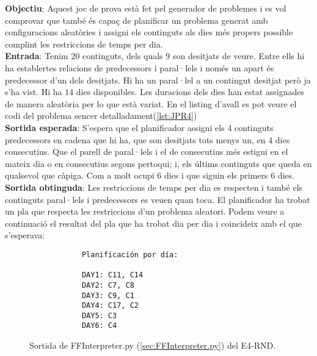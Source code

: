 \documentclass[a4paper]{article}
\begin{document}
	\noindent \textbf{Objectiu}: Aquest joc de prova està fet pel generador de problemes i es vol comprovar que també és capaç de planificar un problema generat amb configuracions aleatòries i assigni els continguts als dies més propers possible complint les restriccions de temps per dia.\\
	
	\noindent \textbf{Entrada}: Tenim 20 continguts, dels quals 9 son desitjats de veure. Entre ells hi ha establertes relacions de predecessors i paral·lels i només un apart és predecessor d'un dels desitjats. Hi ha un paral·lel a un contingut desitjat però ja s'ha vist. Hi ha 14 dies disponibles. Les duracions dels dies han estat assignades de manera aleatòria per lo que està variat. En el listing d'avall es pot veure el codi del problema sencer detalladament(\ref{lst:JPR4})\\
	
	\noindent \textbf{Sortida esperada}: S'espera que el planificador assigni els 4 continguts predecessors en cadena que hi ha, que son desitjats tots menys un, en 4 dies consecutius. Que el parell de paral·lels i el de consecutius més estigui en el mateix dia o en consecutius segons pertoqui; i, els últims continguts que queda en qualsevol que càpiga. Com a molt ocupi 6 dies i que siguin els primers 6 dies.\\
	
	\noindent \textbf{Sortida obtinguda}: Les restriccions de temps per dia es respecten i també els continguts paral·lels i predecessors es veuen quan toca. El planificador ha trobat un pla que respecta les restriccions d'un problema aleatori.  Podem veure a continuació el resultat del pla que ha trobat dia per dia i coincideix amb el que s'esperava:\\
	
	\begin{figure}[H]
		\centering
		\begin{verbatim}
			Planificación por día:
			
			DAY1: C11, C14
			DAY2: C7, C8
			DAY3: C9, C1
			DAY4: C17, C2
			DAY5: C3
			DAY6: C4
		\end{verbatim}
		\caption{Sortida de FFInterpreter.py (\ref{sec:FFInterpreter.py}) del E4-RND.}
	\end{figure}
	
\end{document}
